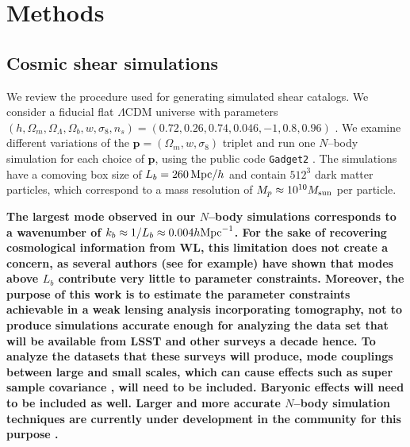 \documentclass[reprint,aps,prd,superscriptaddress,showkeys,showpacs]{revtex4-1}
\newcommand{\bb}[1]{\mathbf{#1}}
\newcommand{\ttt}[1]{\texttt{#1}}
\begin{document}

\section{Methods}
\label{sec:methods}


\subsection{Cosmic shear simulations}
\label{sec:shearsim}
We review the procedure used for generating simulated shear catalogs. We consider a fiducial flat $\Lambda$CDM universe with parameters $(h,\Omega_m,\Omega_\Lambda,\Omega_b,w,\sigma_8,n_s)=(0.72,0.26,0.74,0.046,-1,0.8,0.96)$ \citep{WMAP9,PlanckCosmo}. We examine different variations of the $\bb{p}=(\Omega_m,w,\sigma_8)$ triplet and run one $N$--body simulation for each choice of $\bb{p}$, using the public code \ttt{Gadget2} \citep{Gadget2}. The simulations have a comoving box size of $L_b=260\,{\rm Mpc}/h$ and contain $512^3$ dark matter particles, which correspond to a mass resolution of $M_p\approx 10^{10}M_{\rm sun}$ per particle. 

{\bf \color{red} The largest mode observed in our $N$--body simulations corresponds to a wavenumber of $k_b\approx1/L_b\approx 0.004 h{\rm Mpc}^{-1}$. For the sake of recovering cosmological information from WL, this limitation does not create a concern, as several authors (see \citep{FangHaiman07} for example) have shown that modes above $L_b$ contribute very little to parameter constraints. 
Moreover, the purpose of this work is to estimate the parameter constraints achievable in a weak lensing analysis incorporating tomography, not to produce simulations accurate enough for analyzing the data set that will be available from LSST and other surveys a decade hence. To analyze the datasets that these surveys will produce, mode couplings between large and small scales, which can cause effects such as super sample covariance \citep{Sato12,SSC1,SSC2}, will need to be included. Baryonic effects will need to be included as well. Larger and more accurate $N$--body simulation techniques are currently under development in the community for this purpose \citep{Qcontinuum,HACC}.}
\end{document}
